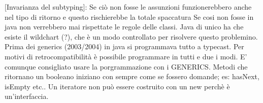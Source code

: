 [Invarianza del subtyping]: Se ciò non fosse le assunzioni funzionerebbero anche nel tipo di ritorno e questo rischierebbe la totale spaccatura \newline
Se cosi non fosse in java non verrebbero mai rispettate le regole delle classi. \newline
Java di unico ha che esiste il wildchart (?), che è un modo controllato per risolvere questo problemino. \newline
Prima dei generics (2003/2004) in java si programmava tutto a typecast. Per motivi di retrocompatibilità è possibile programmare in tutti e due i modi. E' comunque consigliato usare la porgrammazione con i GENERICS. \newline
Metodi che ritornano un booleano iniziano con sempre come se fossero domande; es: hasNext, isEmpty etc.. \newline
Un iteratore non può essere costruito con un new perchè è un'interfaccia. 



\newpage
